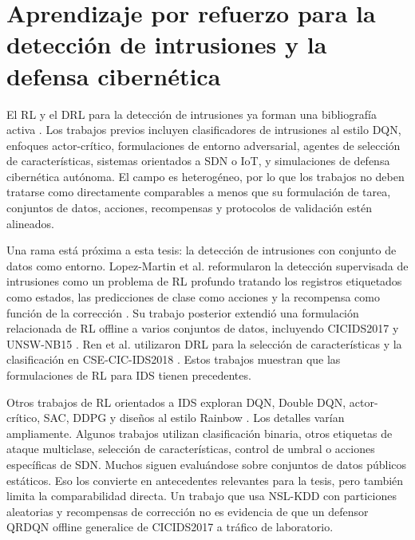 \section{Aprendizaje por refuerzo para la detección de intrusiones y la defensa cibernética}

El RL y el DRL para la detección de intrusiones ya forman una bibliografía activa \parencite{Yang2024DRLNIDSSurvey,Kheddar2025RLIDSReview,Gueriani2024DRLIoTIDSSurvey,Adawadkar2022CyberSecurityRLSurvey}. Los trabajos previos incluyen clasificadores de intrusiones al estilo DQN, enfoques actor-crítico, formulaciones de entorno adversarial, agentes de selección de características, sistemas orientados a SDN o IoT, y simulaciones de defensa cibernética autónoma. El campo es heterogéneo, por lo que los trabajos no deben tratarse como directamente comparables a menos que su formulación de tarea, conjuntos de datos, acciones, recompensas y protocolos de validación estén alineados.

Una rama está próxima a esta tesis: la detección de intrusiones con conjunto de datos como entorno. Lopez-Martin et al. reformularon la detección supervisada de intrusiones como un problema de RL profundo tratando los registros etiquetados como estados, las predicciones de clase como acciones y la recompensa como función de la corrección \parencite{LopezMartin2020DRLIDS}. Su trabajo posterior extendió una formulación relacionada de RL offline a varios conjuntos de datos, incluyendo CICIDS2017 y UNSW-NB15 \parencite{LopezMartin2021RBFOfflineRL}. Ren et al. utilizaron DRL para la selección de características y la clasificación en CSE-CIC-IDS2018 \parencite{Ren2022IDRDRL}. Estos trabajos muestran que las formulaciones de RL para IDS tienen precedentes.

Otros trabajos de RL orientados a IDS exploran DQN, Double DQN, actor-crítico, SAC, DDPG y diseños al estilo Rainbow \parencite{Caminero2019AERLIDS,AESAC2023RLIDS,Alavizadeh2021,Hossain2025DQIDS}. Los detalles varían ampliamente. Algunos trabajos utilizan clasificación binaria, otros etiquetas de ataque multiclase, selección de características, control de umbral o acciones específicas de SDN. Muchos siguen evaluándose sobre conjuntos de datos públicos estáticos. Eso los convierte en antecedentes relevantes para la tesis, pero también limita la comparabilidad directa. Un trabajo que usa NSL-KDD con particiones aleatorias y recompensas de corrección no es evidencia de que un defensor QRDQN offline generalice de CICIDS2017 a tráfico de laboratorio.

